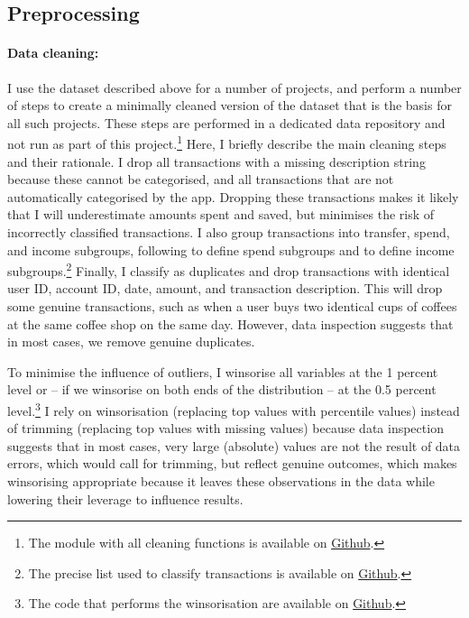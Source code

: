 \subsection{Preprocessing}%
\label{sub:preprocessing}

\paragraph{Data cleaning:}%
\label{par:data_cleaning}

I use the dataset described above for a number of projects, and perform a
number of steps to create a minimally cleaned version of the dataset that is
the basis for all such projects. These steps are performed in a dedicated data
repository and not run as part of this project.\footnote{The module with all
cleaning functions is available on
\href{https:/egithub.com/fabiangunzinger/mdb_eval/blob/f51e49c95c5884d2dc417be23921a8acd85aec9d/src/data/clean.py}{Github}.}
Here, I briefly describe the main cleaning steps and their rationale. I drop
all transactions with a missing description string because these cannot be
categorised, and all transactions that are not automatically categorised by the
app. Dropping these transactions makes it likely that I will underestimate
amounts spent and saved, but minimises the risk of incorrectly classified
transactions. I also group transactions into transfer, spend, and income
subgroups, following \citet{muggleton2020evidence} to define spend subgroups
and \citet{hacioglu2021distributional} to define income subgroups.\footnote{
The precise list used to classify transactions is available on
\href{https://github.com/fabiangunzinger/mdb_eval/blob/92af366d4c4052cc7a7f78a6178086de8ecdfb75/src/data/txn_classifications.py}{Github}.}
Finally, I classify as duplicates and drop transactions with identical user ID,
account ID, date, amount, and transaction description. This will drop some
genuine transactions, such as when a user buys two identical cups of coffees at
the same coffee shop on the same day. However, data inspection suggests that in
most cases, we remove genuine duplicates.

To minimise the influence of outliers, I winsorise all variables at the 1
percent level or -- if we winsorise on both ends of the distribution -- at the
0.5 percent level.\footnote{The code that performs the winsorisation are
    available on
\href{https://github.com/fabiangunzinger/mdb_eval/blob/d04fe186bb5cca884af2b7c1c7ad429674ef701d/src/data/transformers.py}{Github}.}
I rely on winsorisation (replacing top values with percentile values) instead
of trimming (replacing top values with missing values) because data inspection
suggests that in most cases, very large (absolute) values are not the result of
data errors, which would call for trimming, but reflect genuine outcomes, which
makes winsorising appropriate because it leaves these observations in the data
while lowering their leverage to influence results.


